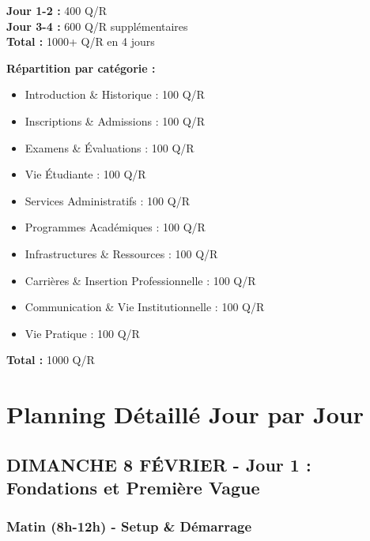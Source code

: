 \documentclass[11pt,a4paper]{article}
\begin{document}
\begin{info}
\textbf{Jour 1-2 :} 400 Q/R \\
\textbf{Jour 3-4 :} 600 Q/R supplémentaires \\
\textbf{Total :} 1000+ Q/R en 4 jours

\vspace{0.3cm}
\textbf{Répartition par catégorie :}
\begin{itemize}
    \item Introduction \& Historique : 100 Q/R
    \item Inscriptions \& Admissions : 100 Q/R
    \item Examens \& Évaluations : 100 Q/R
    \item Vie Étudiante : 100 Q/R
    \item Services Administratifs : 100 Q/R
    \item Programmes Académiques : 100 Q/R
    \item Infrastructures \& Ressources : 100 Q/R
    \item Carrières \& Insertion Professionnelle : 100 Q/R
    \item Communication \& Vie Institutionnelle : 100 Q/R
    \item Vie Pratique : 100 Q/R
\end{itemize}

\textbf{Total :} 1000 Q/R
\end{info}

\clearpage

\section{Planning Détaillé Jour par Jour}
\label{sec:planning}

\subsection{DIMANCHE 8 FÉVRIER - Jour 1 : Fondations et Première Vague}

\subsubsection{Matin (8h-12h) - Setup \& Démarrage}
\end{document}
